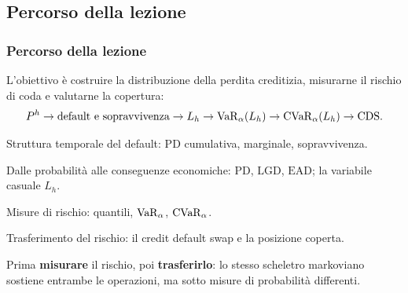 



\subsection{Percorso della lezione}%

\begin{frame}%
%

\frametitle{Percorso della lezione}%
%

%


L'obiettivo \`{e} costruire la distribuzione della perdita creditizia,
misurarne il rischio di coda e valutarne la copertura:
\[
P^{h} \rightarrow\text{default e sopravvivenza} \rightarrow L_{h}
\rightarrow\operatorname{VaR}_{\alpha}(L_{h}) \rightarrow\operatorname{CVaR}_{\alpha}(L_{h})
\rightarrow\text{CDS}.
\]


\medskip

\begin{stepenumerate}
\item[1.] Struttura temporale del default: $\mathrm{PD}$ cumulativa,
marginale, sopravvivenza.

\item[2.] Dalle probabilit\`{a} alle conseguenze economiche: $\mathrm{PD}$,
$\mathrm{LGD}$, $\mathrm{EAD}$; la variabile casuale $L_{h}$.

\item[3.] Misure di rischio: quantili, $\operatorname{VaR}_{\alpha}$, $\operatorname{CVaR}_{\alpha}$.

\item[4.] Trasferimento del rischio: il credit default swap e la posizione coperta.
\end{stepenumerate}

\medskip

\begin{center}
{\small Prima \textbf{misurare} il rischio, poi \textbf{trasferirlo}: lo
stesso scheletro markoviano sostiene entrambe le operazioni, ma sotto misure
di probabilit\`{a} differenti.}
\end{center}

%

\transboxout
\end{frame}%



